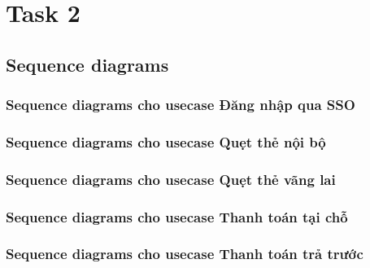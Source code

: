 \section{Task 2}

\subsection{\textbf{Sequence diagrams}}
\subsubsection{Sequence diagrams cho usecase Đăng nhập qua SSO}





\subsubsection{Sequence diagrams cho usecase Quẹt thẻ nội bộ}



\newpage

\subsubsection{Sequence diagrams cho usecase Quẹt thẻ vãng lai }




 

\newpage

\subsubsection{Sequence diagrams cho usecase Thanh toán tại chỗ}



\newpage

\subsubsection{Sequence diagrams cho usecase Thanh toán trả trước}





